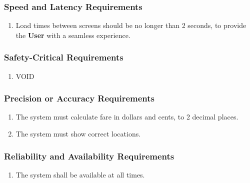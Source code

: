 \documentclass[english]{article}
\begin{document}
\subsubsection{Speed and Latency Requirements}
\label{ssub:speed_and_latency_requirements}
\begin{enumerate}[{SLR}1. ]
	\item Load times between screens should be no longer than 2 seconds, to provide the \textbf{User} with a seamless experience.
\end{enumerate}

\subsubsection{Safety-Critical Requirements}
\label{ssub:safety_critical_requirements}
\begin{enumerate}[{SCR}1. ]
	\item VOID
\end{enumerate}

\subsubsection{Precision or Accuracy Requirements}
\label{ssub:precision_or_accuracy_requirements}
\begin{enumerate}[{PAR}1. ]
	\item The system must calculate fare in dollars and cents, to 2 decimal places.
	\item The system must show correct locations.
\end{enumerate}

\subsubsection{Reliability and Availability Requirements}
\label{ssub:reliability_and_availability_requirements}
\begin{enumerate}[{RAR}1. ]
	\item The system shall be available at all times.
\end{enumerate}
\end{document}
